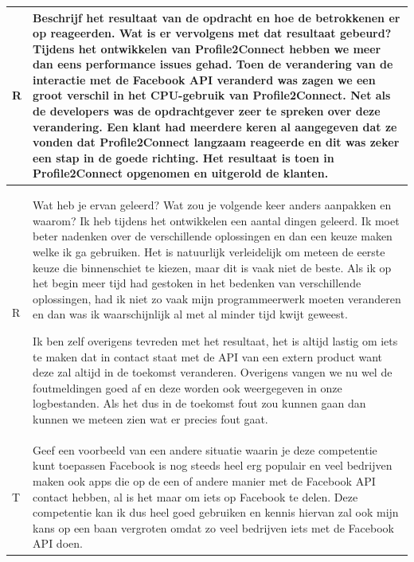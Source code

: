 \begin{tabularx}{\textwidth}{| l | X |}
\\
\hline
R & Beschrijf het resultaat van de opdracht en hoe de betrokkenen er op reageerden. Wat is er vervolgens met dat resultaat gebeurd?
\newline
\newline
Tijdens het ontwikkelen van Profile2Connect hebben we meer dan eens performance issues gehad. Toen de verandering van de interactie met de Facebook API veranderd was zagen we een groot verschil in het CPU-gebruik van Profile2Connect. Net als de developers was de opdrachtgever zeer te spreken over deze verandering. Een klant had meerdere keren al aangegeven dat ze vonden dat Profile2Connect langzaam reageerde en dit was zeker een stap in de goede richting. Het resultaat is toen in Profile2Connect opgenomen en uitgerold de klanten.
\\
\hline
R & Wat heb je ervan geleerd? Wat zou je volgende keer anders aanpakken en waarom?
\newline
\newline
Ik heb tijdens het ontwikkelen een aantal dingen geleerd. Ik moet beter nadenken over de verschillende oplossingen en dan een keuze maken welke ik ga gebruiken. Het is natuurlijk verleidelijk om meteen de eerste keuze die binnenschiet te kiezen, maar dit is vaak niet de beste. Als ik op het begin meer tijd had gestoken in het bedenken van verschillende oplossingen, had ik niet zo vaak mijn programmeerwerk moeten veranderen en dan was ik waarschijnlijk al met al minder tijd kwijt geweest.

\newline
Ik ben zelf overigens tevreden met het resultaat, het is altijd lastig om iets te maken dat in contact staat met de API van een extern product want deze zal altijd in de toekomst veranderen. Overigens vangen we nu wel de foutmeldingen goed af en deze worden ook weergegeven in onze logbestanden. Als het dus in de toekomst fout zou kunnen gaan dan kunnen we meteen zien wat er precies fout gaat.
\\
\hline
T & Geef een voorbeeld van een andere situatie waarin je deze competentie kunt toepassen
\newline
\newline
Facebook is nog steeds heel erg populair en veel bedrijven maken ook apps die op de een of andere manier met de Facebook API contact hebben, al is het maar om iets op Facebook te delen. Deze competentie kan ik dus heel goed gebruiken en kennis hiervan zal ook mijn kans op een baan vergroten omdat zo veel bedrijven iets met de Facebook API doen.
\\
\hline
\end{tabularx}


